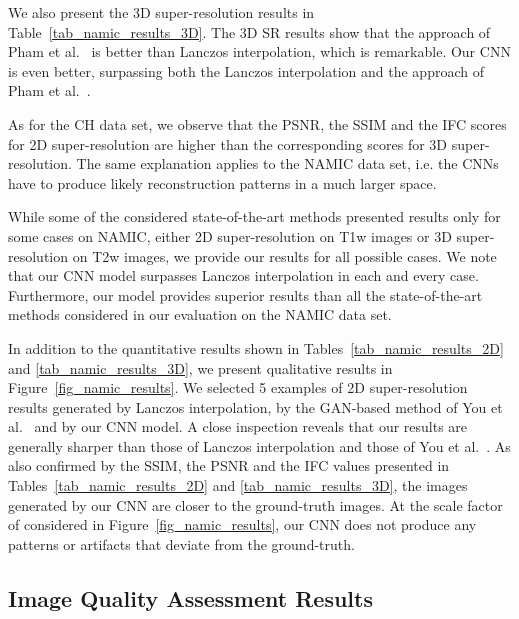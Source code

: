 \documentclass{ieeeaccess}
\begin{document}
We also present the 3D super-resolution results in Table~\ref{tab_namic_results_3D}. The 3D SR results show that the approach of Pham et al.~\cite{Pham-CMIG-2019} is better than Lanczos interpolation, which is remarkable. Our CNN is even better, surpassing both the Lanczos interpolation and the approach of Pham et al.~\cite{Pham-CMIG-2019}.

As for the CH data set, we observe that the PSNR, the SSIM and the IFC scores for 2D super-resolution are higher than the corresponding scores for 3D super-resolution. The same explanation applies to the NAMIC data set, i.e. the CNNs have to produce likely reconstruction patterns in a much larger space.

While some of the considered state-of-the-art methods \cite{Du-AS-2019,Pham-CMIG-2019,ZENG-CBM-2018} presented results only for some cases on NAMIC, either 2D super-resolution on T1w images or 3D super-resolution on T2w images, we provide our results for all possible cases. We note that our CNN model surpasses Lanczos interpolation in each and every case. Furthermore, our model provides superior results than all the state-of-the-art methods \cite{Du-AS-2019,Pham-CMIG-2019,You-TMI-2019,ZENG-CBM-2018} considered in our evaluation on the NAMIC data set.

In addition to the quantitative results shown in Tables~\ref{tab_namic_results_2D} and \ref{tab_namic_results_3D}, we present qualitative results in Figure~\ref{fig_namic_results}. We selected 5 examples of 2D super-resolution results generated by Lanczos interpolation, by the GAN-based method of You et al.~\cite{You-TMI-2019} and by our CNN model. A close inspection reveals that our results are generally sharper than those of Lanczos interpolation and those of You et al.~\cite{You-TMI-2019}. As also confirmed by the SSIM, the PSNR and the IFC values presented in Tables~\ref{tab_namic_results_2D} and \ref{tab_namic_results_3D}, the images generated by our CNN are closer to the ground-truth images. At the scale factor of  considered in Figure~\ref{fig_namic_results}, our CNN does not produce any patterns or artifacts that deviate from the ground-truth.

\subsection{Image Quality Assessment Results}
\end{document}
